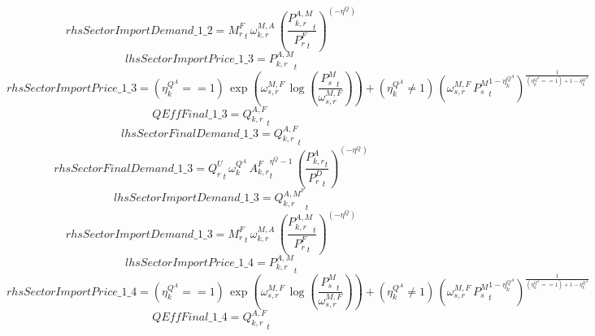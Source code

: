 \begin{dmath*}
rhsSectorImportDemand\_1\_2 = {{M^F_r}}_{t}\, {{\omega^{M,A}_{k,r}}}\, \left(\frac{{{P^{A,M}_{k,r}}}_{t}}{{{P^F_{r}}}_{t}}\right)^{\left(-{{\eta^{Q}}}\right)}
\end{dmath*}
\begin{dmath*}
lhsSectorImportPrice\_1\_3 = {{P^{A,M}_{k,r}}}_{t}
\end{dmath*}
\begin{dmath*}
rhsSectorImportPrice\_1\_3 = \left({{\eta^{Q^A}_{k}}}==1\right)\, \exp\left({{\omega^{M,F}_{s,r}}}\, \log\left(\frac{{{P^{M}_s}}_{t}}{{{\omega^{M,F}_{s,r}}}}\right)\right)+\left({{\eta^{Q^A}_{k}}}\neq 1\right)\, \left({{\omega^{M,F}_{s,r}}}\, {{P^{M}_s}}_{t}^{1-{{\eta^{Q^A}_{k}}}}\right)^{\frac{1}{\left({{\eta^{Q^A}_{k}}}==1\right)+1-{{\eta^{Q^A}_{k}}}}}
\end{dmath*}
\begin{dmath*}
QEffFinal\_1\_3 = {{Q^{A,F}_{k,r}}}_{t}
\end{dmath*}
\begin{dmath*}
lhsSectorFinalDemand\_1\_3 = {{Q^{A,F}_{k,r}}}_{t}
\end{dmath*}
\begin{dmath*}
rhsSectorFinalDemand\_1\_3 = {{Q^{U}_{r}}}_{t}\, {{\omega^{Q^A}_{k}}}\, {{A^{F}_{k,r}}}_{t}^{{{\eta^{Q}}}-1}\, \left(\frac{{{P^{A}_{k,r}}}_{t}}{{{P^D_{r}}}_{t}}\right)^{\left(-{{\eta^{Q}}}\right)}
\end{dmath*}
\begin{dmath*}
lhsSectorImportDemand\_1\_3 = {{Q^{A,M^F}_{k,r}}}_{t}
\end{dmath*}
\begin{dmath*}
rhsSectorImportDemand\_1\_3 = {{M^F_r}}_{t}\, {{\omega^{M,A}_{k,r}}}\, \left(\frac{{{P^{A,M}_{k,r}}}_{t}}{{{P^F_{r}}}_{t}}\right)^{\left(-{{\eta^{Q}}}\right)}
\end{dmath*}
\begin{dmath*}
lhsSectorImportPrice\_1\_4 = {{P^{A,M}_{k,r}}}_{t}
\end{dmath*}
\begin{dmath*}
rhsSectorImportPrice\_1\_4 = \left({{\eta^{Q^A}_{k}}}==1\right)\, \exp\left({{\omega^{M,F}_{s,r}}}\, \log\left(\frac{{{P^{M}_s}}_{t}}{{{\omega^{M,F}_{s,r}}}}\right)\right)+\left({{\eta^{Q^A}_{k}}}\neq 1\right)\, \left({{\omega^{M,F}_{s,r}}}\, {{P^{M}_s}}_{t}^{1-{{\eta^{Q^A}_{k}}}}\right)^{\frac{1}{\left({{\eta^{Q^A}_{k}}}==1\right)+1-{{\eta^{Q^A}_{k}}}}}
\end{dmath*}
\begin{dmath*}
QEffFinal\_1\_4 = {{Q^{A,F}_{k,r}}}_{t}
\end{dmath*}
